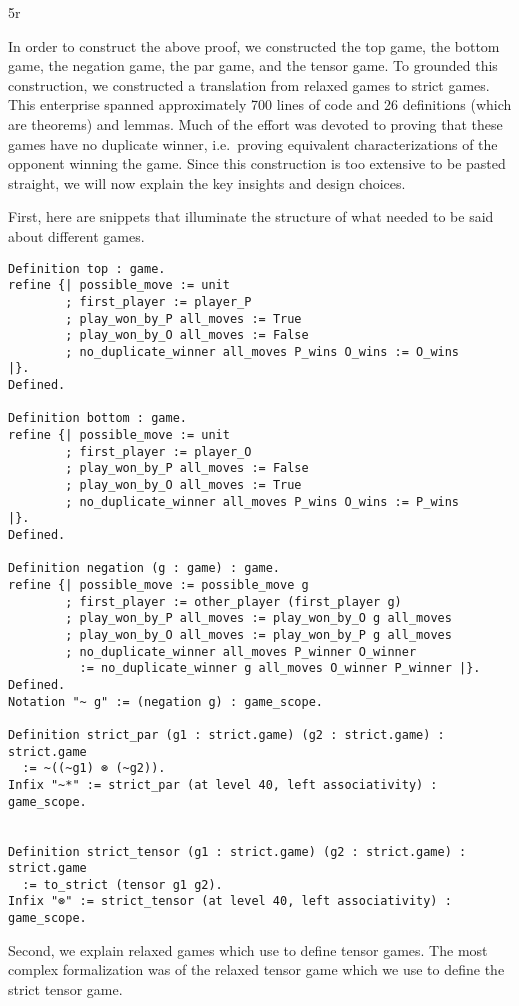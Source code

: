 5r\documentclass{article}
\theoremstyle{definition}
\begin{document}
\setcounter{thm}{\value{savethm}}

In order to construct the above proof, we constructed the top game, the bottom game, the negation game, the par game, and the tensor game. To grounded this construction, we constructed a translation from relaxed games to strict games. This enterprise spanned approximately 700 lines of code and 26  definitions (which are theorems) and lemmas. Much of the effort was devoted to proving that these games have no duplicate winner, i.e.\ proving equivalent characterizations of the opponent winning the game. Since this construction is too extensive to be pasted straight, we will now explain the key insights and design choices.

First, here are  snippets that illuminate the structure of what needed to be said about different games. 

\begin{verbatim}
Definition top : game.
refine {| possible_move := unit 
        ; first_player := player_P
        ; play_won_by_P all_moves := True
        ; play_won_by_O all_moves := False 
        ; no_duplicate_winner all_moves P_wins O_wins := O_wins    
|}.
Defined.    

Definition bottom : game.
refine {| possible_move := unit
        ; first_player := player_O
        ; play_won_by_P all_moves := False
        ; play_won_by_O all_moves := True
        ; no_duplicate_winner all_moves P_wins O_wins := P_wins
|}.
Defined.    
    
Definition negation (g : game) : game.
refine {| possible_move := possible_move g
        ; first_player := other_player (first_player g)
        ; play_won_by_P all_moves := play_won_by_O g all_moves 
        ; play_won_by_O all_moves := play_won_by_P g all_moves
        ; no_duplicate_winner all_moves P_winner O_winner 
          := no_duplicate_winner g all_moves O_winner P_winner |}.
Defined.
Notation "~ g" := (negation g) : game_scope.

Definition strict_par (g1 : strict.game) (g2 : strict.game) : strict.game 
  := ~((~g1) ⊗ (~g2)).
Infix "~*" := strict_par (at level 40, left associativity) : game_scope.


Definition strict_tensor (g1 : strict.game) (g2 : strict.game) : strict.game 
  := to_strict (tensor g1 g2).
Infix "⊗" := strict_tensor (at level 40, left associativity) : game_scope.

\end{verbatim}

Second, we  explain relaxed games which \textcite{Blass1992} use to define tensor games. The most complex formalization was of the relaxed tensor game which we use to define the strict tensor game. 
\end{document}
